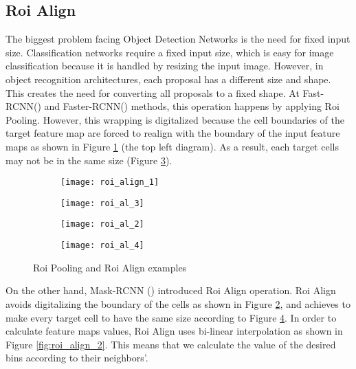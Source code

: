 \subsection{Roi Align}

The biggest problem facing Object Detection Networks is the need for fixed input size. Classification networks require a fixed input size, which
is easy for image classification because it is handled by resizing the input image. However, in object recognition architectures, each proposal has a different size
and shape. This creates the need for converting all proposals to a fixed shape. At Fast-RCNN(\cite{Girshick:2015:FR:2919332.2920125}) and
Faster-RCNN(\cite{Ren:2015:FRT:2969239.2969250}) methods, this operation happens by applying Roi Pooling. However, this wrapping is digitalized because
the cell boundaries of the target feature map are forced to realign with the boundary of the input feature maps as shown in Figure \ref{fig:roi_pooling_align_1}
(the top left diagram). As a result, each target cells may not be in the same size (Figure \ref{fig:roi_pooling_align_2}).


\begin {figure}[h]

  \begin{subfigure}{0.35\textwidth}
    \centering
    \texttt{[image: roi\_align\_1]}
    \caption{}
    \label{fig:roi_pooling_align_1}
  \end{subfigure}
  \hfill
  \begin{subfigure}{0.35\textwidth}
    \centering
    \texttt{[image: roi\_al\_3]}
    \caption{}
    \label{fig:roi_pooling_align_3}
  \end{subfigure}
  \hfill
  \begin{subfigure}{0.35\textwidth}
    \centering
    \texttt{[image: roi\_al\_2]}
    \caption{}
    \label{fig:roi_pooling_align_2}
  \end{subfigure}
  \hfill
  \begin{subfigure}{0.35\textwidth}
    \centering
    \texttt{[image: roi\_al\_4]}
    \caption{}
    \label{fig:roi_pooling_align_4}
  \end{subfigure}
  \caption{Roi Pooling and Roi Align examples}
  \label{fig:roi_pooling_align}
\end{figure}

On the other hand, Mask-RCNN (\cite{DBLP:journals/corr/HeGDG17}) introduced Roi Align operation. Roi Align avoids digitalizing
the boundary of the cells as shown in Figure \ref{fig:roi_pooling_align_3}, and achieves to make every target cell to have the same size
according to Figure \ref{fig:roi_pooling_align_4}. In order to calculate feature maps values, Roi Align uses bi-linear interpolation as
shown in Figure \ref{fig:roi_align_2}. This means that we calculate the value of the desired bins according to their neighbors'.


